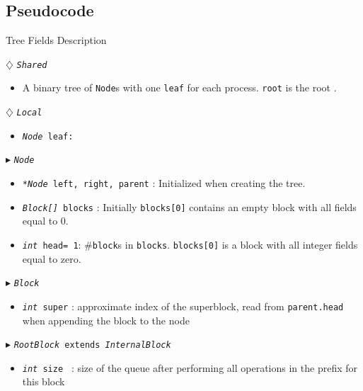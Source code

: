 \documentclass[10pt]{article}
\renewcommand{\tt}[1]{\texttt{#1}}
\renewcommand{\sl}[1]{\textsl{#1}}
\newcommand{\nf}[1]{{\normalfont{\texttt{#1}}}}
\newcommand{\head}{head}
\newcommand{\size}{size }
\theoremstyle{definition}
\begin{document}
\subsection{Pseudocode} \label{algQ}
\begin{algorithm}
\caption{Tree Fields Description}
\begin{algorithmic}[1]
\setcounter{ALG@line}{100}
\begin{multicols}{2}

\Statex $\diamondsuit$ \tt{\sl{Shared}}
\begin{itemize}
\item \textsf{A binary tree of \tt{Node}s with one \tt{leaf} for each process. \tt{root} is the root \nf{node}.}
\end{itemize}

\Statex $\diamondsuit$ \tt{\sl{Local}}
\begin{itemize}
\item \tt{\sl{Node} leaf:} 
\end{itemize}

\Statex $\blacktriangleright$ \tt{\sl{Node}}
\begin{itemize}
\item \tt{\sl{*Node} left, right, parent} \textsf{: Initialized  when creating the tree.}
\item \tt{\sl{Block[]} blocks} \textsf{: Initially \tt{blocks[0]} contains an empty block with all fields equal to 0.}
\item \tt{\sl{int} \head= 1}\textsf{: \#\tt{block}s in \tt{blocks}. \tt{blocks[0]} is a block with all integer fields equal to zero.}
\end{itemize}

\Statex $\blacktriangleright$ \tt{\sl{Block}} 

\begin{itemize}
  \item \tt{\sl{int} super}
  \textsf{: approximate index of the superblock, read from \tt{parent.head} when appending the block to the node}
\end{itemize}


\Statex $\blacktriangleright$ \tt{\sl{RootBlock} extends \sl{InternalBlock}}
\begin{itemize}
  \item \tt{\sl{int} \size}
  \textsf{: size of the queue after performing all operations in the prefix for this block}
\end{itemize}

\pagebreak


\end{multicols}
\end{algorithmic}
\end{algorithm}
\end{document}
